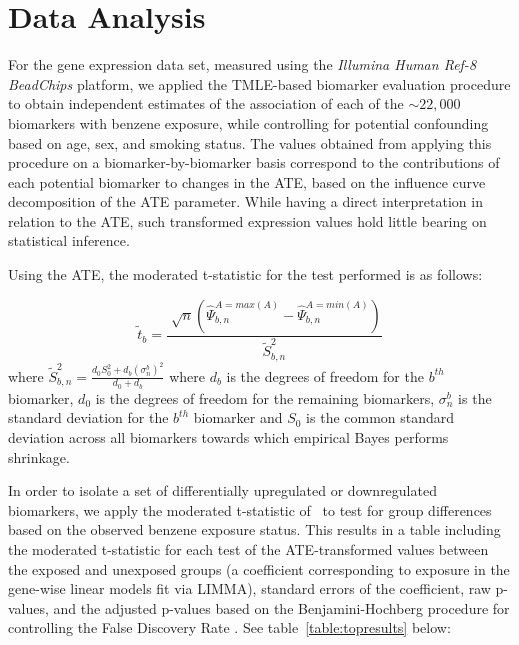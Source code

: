 \chapter{Data Analysis}

For the gene expression data set, measured using the \textit{Illumina Human
Ref-8 BeadChips} platform, we applied the TMLE-based biomarker evaluation
procedure to obtain independent estimates of the association of each of the
$\sim 22,000$ biomarkers with benzene exposure, while controlling for potential
confounding based on age, sex, and smoking status. The values obtained from
applying this procedure on a biomarker-by-biomarker basis correspond to the
contributions of each potential biomarker to changes in the ATE, based on the
influence curve decomposition of the ATE parameter. While having a direct
interpretation in relation to the ATE, such transformed expression values hold
little bearing on statistical inference.

Using the ATE, the moderated t-statistic for the test performed is as follows:

$$\tilde{t}_b=\frac{\sqrt[]{n} (\hat{\Psi}_{b,n}^{A = max(A)}-
\hat{\Psi}_{b,n}^{A = min(A)})}{\tilde{S}_{b,n}^2}$$ where
$\tilde{S}_{b,n}^2=\frac{d_0S_0^2+d_b (\sigma^b_n)^2}{d_0+d_b}$ where $d_b$ is
the degrees of freedom for the $b^{th}$ biomarker, $d_0$ is the degrees of
freedom for the remaining biomarkers, $\sigma^b_n$ is the standard deviation for
the $b^{th}$ biomarker and $S_0$ is the common standard deviation across all
biomarkers towards which empirical Bayes performs shrinkage.

In order to isolate a set of differentially upregulated or downregulated
biomarkers, we apply the moderated t-statistic of~\cite{smyth2004linear} to
test for group differences based on the observed benzene exposure status. This
results in a table including the moderated t-statistic for each test of the
ATE-transformed values between the exposed and unexposed groups (a coefficient
corresponding to exposure in the gene-wise linear models fit via LIMMA),
standard errors of the coefficient, raw p-values, and the adjusted p-values
based on the Benjamini-Hochberg procedure for controlling the False Discovery
Rate \cite{benjamini1995controlling}. See table~\ref{table:topresults} below:

